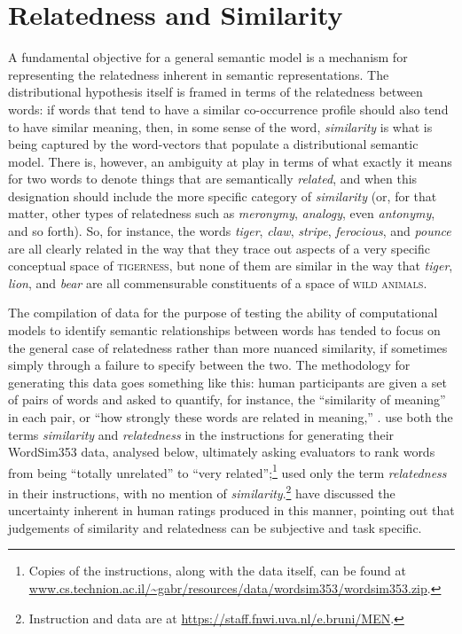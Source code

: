 \section{Relatedness and Similarity}
A fundamental objective for a general semantic model is a mechanism for representing the relatedness inherent in semantic representations.  The distributional hypothesis itself is framed in terms of the relatedness between words: if words that tend to have a similar co-occurrence profile should also tend to have similar meaning, then, in some sense of the word, \emph{similarity} is what is being captured by the word-vectors that populate a distributional semantic model.  There is, however, an ambiguity at play in terms of what exactly it means for two words to denote things that are semantically \emph{related}, and when this designation should include the more specific category of \emph{similarity} (or, for that matter, other types of relatedness such as \emph{meronymy}, \emph{analogy}, even \emph{antonymy}, and so forth).  So, for instance, the words \emph{tiger}, \emph{claw}, \emph{stripe}, \emph{ferocious}, and \emph{pounce} are all clearly related in the way that they trace out aspects of a very specific conceptual space of \textsc{tigerness}, but none of them are similar in the way that \emph{tiger}, \emph{lion}, and \emph{bear} are all commensurable constituents of a space of \textsc{wild animals}.

The compilation of data for the purpose of testing the ability of computational models to identify semantic relationships between words has tended to focus on the general case of relatedness rather than more nuanced similarity, if sometimes simply through a failure to specify between the two.  The methodology for generating this data goes something like this: human participants are given a set of pairs of words and asked to quantify, for instance, the ``similarity of meaning'' \citep[][p. 628]{RubensteinEA1965} in each pair, or ``how strongly these words are related in meaning,'' \citep[][p. 124]{YangEA2006}.  \cite{FinkelsteinEA2002} use both the terms \emph{similarity} and \emph{relatedness} in the instructions for generating their WordSim353 data, analysed below, ultimately asking evaluators to rank words from being ``totally unrelated'' to ``very related'';\footnote{Copies of the instructions, along with the data itself, can be found at \url{www.cs.technion.ac.il/~gabr/resources/data/wordsim353/wordsim353.zip}.} \cite{BruniEA2012} used only the term \emph{relatedness} in their instructions, with no mention of \emph{similarity}.\footnote{Instruction and data are at \url{https://staff.fnwi.uva.nl/e.bruni/MEN}.}  \cite{FaruquiEA2016} have discussed the uncertainty inherent in human ratings produced in this manner, pointing out that judgements of similarity and relatedness can be subjective and task specific.

